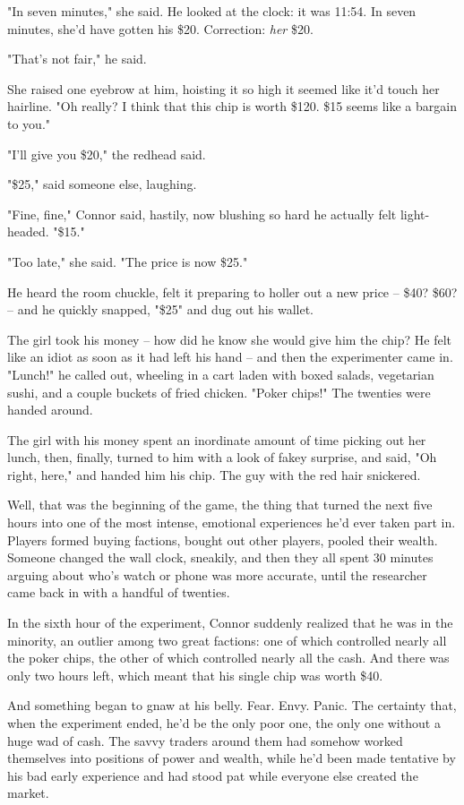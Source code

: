 "In seven minutes," she said. He looked at the clock: it was 11:54.
In seven minutes, she'd have gotten his \$20. Correction:
\emph{her} \$20.

"That's not fair," he said.

She raised one eyebrow at him, hoisting it so high it seemed like
it'd touch her hairline. "Oh really? I think that this chip is
worth \$120. \$15 seems like a bargain to you."

"I'll give you \$20," the redhead said.

"\$25," said someone else, laughing.

"Fine, fine," Connor said, hastily, now blushing so hard he
actually felt light-headed. "\$15."

"Too late," she said. "The price is now \$25."

He heard the room chuckle, felt it preparing to holler out a new
price -- \$40? \$60? -- and he quickly snapped, "\$25" and dug out
his wallet.

The girl took his money -- how did he know she would give him the
chip? He felt like an idiot as soon as it had left his hand -- and
then the experimenter came in. "Lunch!" he called out, wheeling in
a cart laden with boxed salads, vegetarian sushi, and a couple
buckets of fried chicken. "Poker chips!" The twenties were handed
around.

The girl with his money spent an inordinate amount of time picking
out her lunch, then, finally, turned to him with a look of fakey
surprise, and said, "Oh right, here," and handed him his chip. The
guy with the red hair snickered.

Well, that was the beginning of the game, the thing that turned the
next five hours into one of the most intense, emotional experiences
he'd ever taken part in. Players formed buying factions, bought out
other players, pooled their wealth. Someone changed the wall clock,
sneakily, and then they all spent 30 minutes arguing about who's
watch or phone was more accurate, until the researcher came back in
with a handful of twenties.

In the sixth hour of the experiment, Connor suddenly realized that
he was in the minority, an outlier among two great factions: one of
which controlled nearly all the poker chips, the other of which
controlled nearly all the cash. And there was only two hours left,
which meant that his single chip was worth \$40.

And something began to gnaw at his belly. Fear. Envy. Panic. The
certainty that, when the experiment ended, he'd be the only poor
one, the only one without a huge wad of cash. The savvy traders
around them had somehow worked themselves into positions of power
and wealth, while he'd been made tentative by his bad early
experience and had stood pat while everyone else created the
market.

